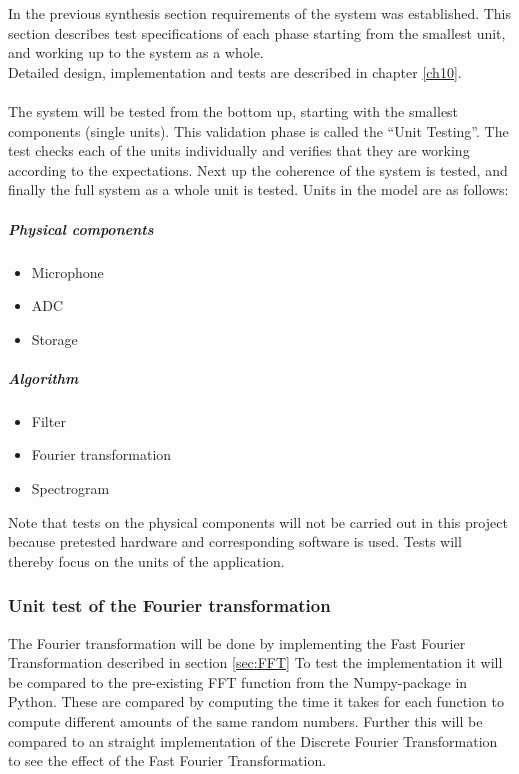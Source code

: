 In the previous synthesis section requirements of the system was established. This section describes test specifications of each phase starting from the smallest unit, and working up to the system as a whole. \\
Detailed design, implementation and tests are described in chapter \ref{ch10}. \\
\\
The system will be tested from the bottom up, starting with the smallest components (single units). This validation phase is called the ``Unit Testing''. The test checks each of the units individually and verifies that they are working according to the expectations. Next up the coherence of the system is tested, and finally the full system as a whole unit is tested. Units in the model are as follows:
\begin{multicols}{2}
\subparagraph{Physical components}  
\begin{itemize}
	\item Microphone
	\item ADC
	\item Storage
\end{itemize}
\columnbreak
\subparagraph{Algorithm}
\begin{itemize}
	\item Filter
	\item Fourier transformation
	\item Spectrogram
\end{itemize}
\end{multicols}
Note that tests on the physical components will not be carried out in this project because pretested hardware and corresponding software is used. Tests will thereby focus on the units of the application.
 
\subsubsection{Unit test of the Fourier transformation}
The Fourier transformation will be done by implementing the Fast Fourier Transformation described in section \ref{sec:FFT} 
To test the implementation it will be compared to the pre-existing FFT function from the Numpy-package in Python. These are compared by computing the time it takes for each function to compute different amounts of the same random numbers. Further this will be compared to an straight  implementation of the Discrete Fourier Transformation to see the effect of the Fast Fourier Transformation.

